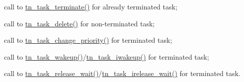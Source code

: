 \begin{DoxyItemize}
\item call to {\ttfamily \hyperlink{tn__tasks_8h_a8ae6615de7022a327bdcd4c37a0f5b90}{tn\+\_\+task\+\_\+terminate()}} for already terminated task;
\item call to {\ttfamily \hyperlink{tn__tasks_8h_adbc4dbbd4a57b73642b76550a0c7c83f}{tn\+\_\+task\+\_\+delete()}} for non-\/terminated task;
\item call to {\ttfamily \hyperlink{tn__tasks_8h_a2ddad9d6dc0e611a7f09c878463aea41}{tn\+\_\+task\+\_\+change\+\_\+priority()}} for terminated task;
\item call to {\ttfamily \hyperlink{tn__tasks_8h_abb88bc8b1cec6b82e7b6e2e90d0e155a}{tn\+\_\+task\+\_\+wakeup()}}/{\ttfamily \hyperlink{tn__tasks_8h_a94e6a0312013e53cf08bcf871e6f4172}{tn\+\_\+task\+\_\+iwakeup()}} for terminated task;
\item call to {\ttfamily \hyperlink{tn__tasks_8h_ae90ecdbd7d87d050c2c98ec775e6efc7}{tn\+\_\+task\+\_\+release\+\_\+wait()}}/{\ttfamily \hyperlink{tn__tasks_8h_aee0ef296af18733f64269386adf8a2d7}{tn\+\_\+task\+\_\+irelease\+\_\+wait()}} for terminated task.
\end{DoxyItemize}

